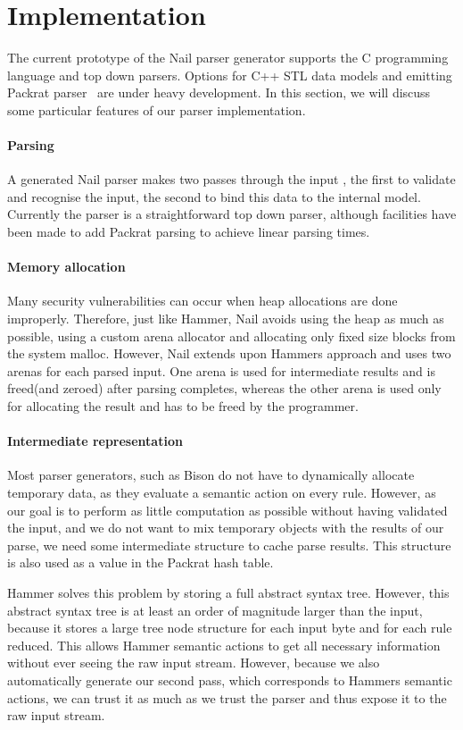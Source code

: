 \section{Implementation}
The current prototype of the Nail parser generator supports the C programming language and top down parsers. Options for C++ STL data models and emitting Packrat parser~\cite{packrat-parsing:icfp02} are under heavy development. In this section, we will discuss some particular
features of our parser implementation.

\paragraph{Parsing}
A generated Nail parser makes two passes through the input , the first to validate and recognise the
input, the second to bind this data to the internal model. Currently the parser is a straightforward
top down parser, although facilities have been made to add Packrat parsing to achieve linear parsing times.
\paragraph{Memory allocation} 
Many security vulnerabilities can occur when heap allocations are done improperly. Therefore, just
like Hammer, Nail avoids using the heap as much as possible, using a custom arena allocator and
allocating only fixed size blocks from the system malloc. However, Nail extends upon Hammers
approach and uses two arenas for each parsed input. One arena is used for intermediate results and is
freed(and zeroed) after parsing completes, whereas the other arena is used only for allocating the
result and has to be freed by the programmer. 

\paragraph{Intermediate representation}
Most parser generators, such as Bison do not have to dynamically allocate temporary
data, as they evaluate a semantic action on every rule. However, as our goal is to perform as little
computation as possible without having validated the input, and we do not want to mix temporary
objects with the results of our parse, we need some intermediate structure to cache parse results.
This structure is also used as a value in the Packrat hash table. 

Hammer solves this problem by storing a full abstract syntax tree. However, this abstract syntax
tree is at least an order of magnitude larger than the input, because it stores a large tree node
structure for each input byte and for each rule reduced. This allows Hammer semantic actions to get
all necessary information without ever seeing the raw input stream. However, because we also
automatically generate our second pass, which corresponds to Hammers semantic actions, we can trust
it as much as we trust the parser and thus expose it to the raw input stream. 

